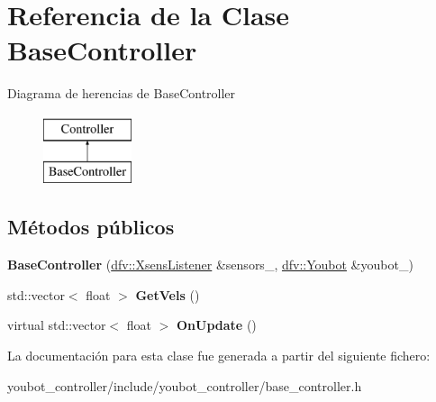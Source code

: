 \hypertarget{classBaseController}{\section{\-Referencia de la \-Clase \-Base\-Controller}
\label{classBaseController}
}
\-Diagrama de herencias de \-Base\-Controller\begin{figure}[H]
\begin{center}
\leavevmode
\includegraphics[height=2.000000cm]{classBaseController}
\end{center}
\end{figure}
\subsection*{\-Métodos públicos}
\begin{DoxyCompactItemize}
\item 
\hypertarget{classBaseController_a84dc2838d3a3c571f5f6ec8185f639e3}{{\bfseries \-Base\-Controller} (\hyperlink{classdfv_1_1XsensListener}{dfv\-::\-Xsens\-Listener} \&sensors\-\_\-, \hyperlink{classdfv_1_1Youbot}{dfv\-::\-Youbot} \&youbot\-\_\-)}\label{classBaseController_a84dc2838d3a3c571f5f6ec8185f639e3}

\item 
\hypertarget{classBaseController_a3e7ae02bc05e02b536ddf1975a6770d3}{std\-::vector$<$ float $>$ {\bfseries \-Get\-Vels} ()}\label{classBaseController_a3e7ae02bc05e02b536ddf1975a6770d3}

\item 
\hypertarget{classBaseController_a80f2ea9001a447f023357245d0490488}{virtual std\-::vector$<$ float $>$ {\bfseries \-On\-Update} ()}\label{classBaseController_a80f2ea9001a447f023357245d0490488}

\end{DoxyCompactItemize}


\-La documentación para esta clase fue generada a partir del siguiente fichero\-:\begin{DoxyCompactItemize}
\item 
youbot\-\_\-controller/include/youbot\-\_\-controller/base\-\_\-controller.\-h\end{DoxyCompactItemize}

